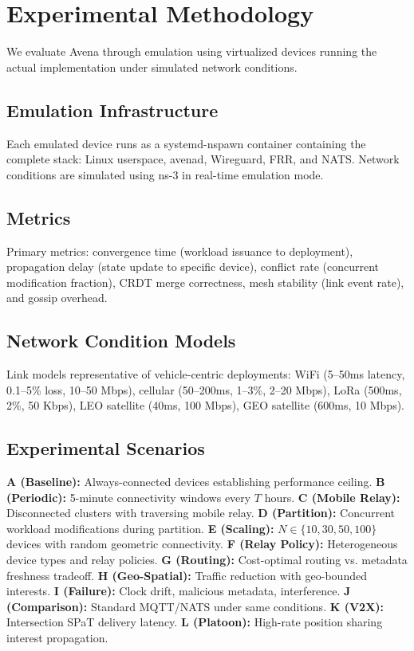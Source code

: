 \documentclass[journal]{IEEEtran}
\begin{document}
\section{Experimental Methodology}
\label{sec:methodology}

We evaluate Avena through emulation using virtualized devices running the actual implementation under simulated network conditions.

\subsection{Emulation Infrastructure}

Each emulated device runs as a systemd-nspawn container containing the complete stack: Linux userspace, avenad, Wireguard, FRR, and NATS. Network conditions are simulated using ns-3 in real-time emulation mode.

\subsection{Metrics}

Primary metrics: convergence time (workload issuance to deployment), propagation delay (state update to specific device), conflict rate (concurrent modification fraction), CRDT merge correctness, mesh stability (link event rate), and gossip overhead.

\subsection{Network Condition Models}

Link models representative of vehicle-centric deployments: WiFi (5--50ms latency, 0.1--5\% loss, 10--50 Mbps), cellular (50--200ms, 1--3\%, 2--20 Mbps), LoRa (500ms, 2\%, 50 Kbps), LEO satellite (40ms, 100 Mbps), GEO satellite (600ms, 10 Mbps).

\subsection{Experimental Scenarios}

\textbf{A (Baseline):} Always-connected devices establishing performance ceiling.
\textbf{B (Periodic):} 5-minute connectivity windows every $T$ hours.
\textbf{C (Mobile Relay):} Disconnected clusters with traversing mobile relay.
\textbf{D (Partition):} Concurrent workload modifications during partition.
\textbf{E (Scaling):} $N \in \{10, 30, 50, 100\}$ devices with random geometric connectivity.
\textbf{F (Relay Policy):} Heterogeneous device types and relay policies.
\textbf{G (Routing):} Cost-optimal routing vs. metadata freshness tradeoff.
\textbf{H (Geo-Spatial):} Traffic reduction with geo-bounded interests.
\textbf{I (Failure):} Clock drift, malicious metadata, interference.
\textbf{J (Comparison):} Standard MQTT/NATS under same conditions.
\textbf{K (V2X):} Intersection SPaT delivery latency.
\textbf{L (Platoon):} High-rate position sharing interest propagation.
\end{document}
